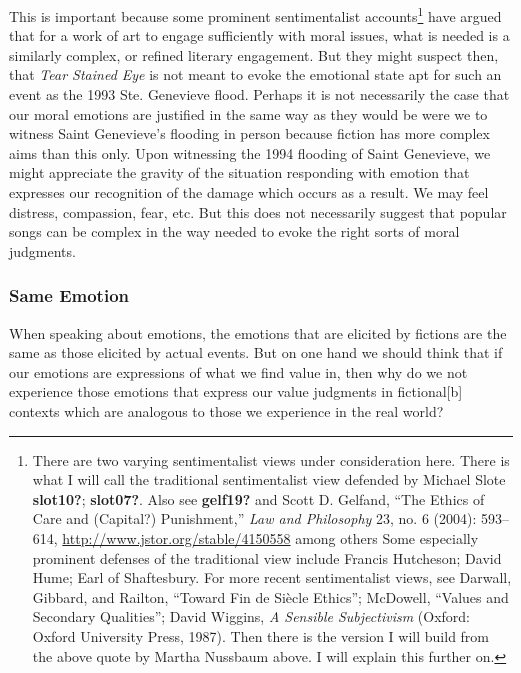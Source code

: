 \documentclass[phdthesis,12pt,final]{wuthesis}
\theoremstyle{definition}
\theoremstyle{definition}
\theoremstyle{definition}
\theoremstyle{definition}
\theoremstyle{remark}
\begin{document}
This is important because some prominent sentimentalist accounts\footnote{There are two varying sentimentalist views under consideration here. There is what I will call the traditional sentimentalist view defended by Michael Slote \textbf{slot10?}; \textbf{slot07?}. Also see \textbf{gelf19?} and Scott D. Gelfand, {``The {Ethics} of {Care} and ({Capital}?) {Punishment},''} \emph{Law and Philosophy} 23, no. 6 (2004): 593--614, \url{http://www.jstor.org/stable/4150558} among others Some especially prominent defenses of the traditional view include Francis Hutcheson; David Hume; Earl of Shaftesbury. For more recent sentimentalist views, see Darwall, Gibbard, and Railton, {``Toward Fin de Siècle Ethics''}; McDowell, {``Values and {Secondary Qualities}''}; David Wiggins, \emph{A Sensible Subjectivism} (Oxford: Oxford University Press, 1987). Then there is the version I will build from the above quote by Martha Nussbaum above. I will explain this further on.} have argued that for a work of art to engage sufficiently with moral issues, what is needed is a similarly complex, or refined literary engagement. But they might suspect then, that \emph{Tear Stained Eye} is not meant to evoke the emotional state apt for such an event as the 1993 Ste. Genevieve flood. Perhaps it is not necessarily the case that our moral emotions are justified in the same way as they would be were we to witness Saint Genevieve's flooding in person because fiction has more complex aims than this only. Upon witnessing the 1994 flooding of Saint Genevieve, we might appreciate the gravity of the situation responding with emotion that expresses our recognition of the damage which occurs as a result. We may feel distress, compassion, fear, etc. But this does not necessarily suggest that popular songs can be complex in the way needed to evoke the right sorts of moral judgments.

\subsubsection*{Same Emotion}\label{same-emotion}

When speaking about emotions, the emotions that are elicited by fictions are the same as those elicited by actual events. But on one hand we should think that if our emotions are expressions of what we find value in, then why do we not experience those emotions that express our value judgments in fictional{[}b{]} contexts which are analogous to those we experience in the real world?
\end{document}
